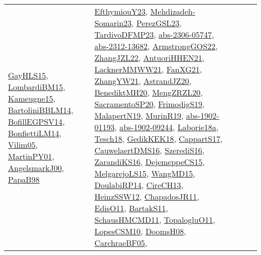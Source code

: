 {\begin{longtable}{llp{6cm}p{6cm}p{6cm}}
\href{papers/GayHLS15.pdf}{GayHLS15}\cite{GayHLS15}, \href{papers/LombardiBM15.pdf}{LombardiBM15}\cite{LombardiBM15}, \href{articles/Kameugne15.pdf}{Kameugne15}\cite{Kameugne15}, \href{papers/BartoliniBBLM14.pdf}{BartoliniBBLM14}\cite{BartoliniBBLM14}, \href{papers/BofillEGPSV14.pdf}{BofillEGPSV14}\cite{BofillEGPSV14}, \href{papers/BonfiettiLM14.pdf}{BonfiettiLM14}\cite{BonfiettiLM14}, \href{papers/Vilim05.pdf}{Vilim05}\cite{Vilim05}, \href{articles/MartinPY01.pdf}{MartinPY01}\cite{MartinPY01}, \href{papers/AngelsmarkJ00.pdf}{AngelsmarkJ00}\cite{AngelsmarkJ00}, \href{articles/PapaB98.pdf}{PapaB98}\cite{PapaB98} & \href{papers/EfthymiouY23.pdf}{EfthymiouY23}\cite{EfthymiouY23}, \href{papers/Mehdizadeh-Somarin23.pdf}{Mehdizadeh-Somarin23}\cite{Mehdizadeh-Somarin23}, \href{papers/PerezGSL23.pdf}{PerezGSL23}\cite{PerezGSL23}, \href{papers/TardivoDFMP23.pdf}{TardivoDFMP23}\cite{TardivoDFMP23}, \href{articles/abs-2306-05747.pdf}{abs-2306-05747}\cite{abs-2306-05747}, \href{articles/abs-2312-13682.pdf}{abs-2312-13682}\cite{abs-2312-13682}, \href{papers/ArmstrongGOS22.pdf}{ArmstrongGOS22}\cite{ArmstrongGOS22}, \href{papers/ZhangJZL22.pdf}{ZhangJZL22}\cite{ZhangJZL22}, \href{papers/AntuoriHHEN21.pdf}{AntuoriHHEN21}\cite{AntuoriHHEN21}, \href{papers/LacknerMMWW21.pdf}{LacknerMMWW21}\cite{LacknerMMWW21}, \href{articles/FanXG21.pdf}{FanXG21}\cite{FanXG21}, \href{articles/ZhangYW21.pdf}{ZhangYW21}\cite{ZhangYW21}, \href{articles/AstrandJZ20.pdf}{AstrandJZ20}\cite{AstrandJZ20}, \href{articles/BenediktMH20.pdf}{BenediktMH20}\cite{BenediktMH20}, \href{articles/MengZRZL20.pdf}{MengZRZL20}\cite{MengZRZL20}, \href{articles/SacramentoSP20.pdf}{SacramentoSP20}\cite{SacramentoSP20}, \href{papers/FrimodigS19.pdf}{FrimodigS19}\cite{FrimodigS19}, \href{papers/MalapertN19.pdf}{MalapertN19}\cite{MalapertN19}, \href{papers/MurinR19.pdf}{MurinR19}\cite{MurinR19}, \href{articles/abs-1902-01193.pdf}{abs-1902-01193}\cite{abs-1902-01193}, \href{articles/abs-1902-09244.pdf}{abs-1902-09244}\cite{abs-1902-09244}, \href{papers/Laborie18a.pdf}{Laborie18a}\cite{Laborie18a}, \href{papers/Tesch18.pdf}{Tesch18}\cite{Tesch18}, \href{articles/GedikKEK18.pdf}{GedikKEK18}\cite{GedikKEK18}, \href{papers/CappartS17.pdf}{CappartS17}\cite{CappartS17}, \href{papers/CauwelaertDMS16.pdf}{CauwelaertDMS16}\cite{CauwelaertDMS16}, \href{papers/SzerediS16.pdf}{SzerediS16}\cite{SzerediS16}, \href{articles/ZarandiKS16.pdf}{ZarandiKS16}\cite{ZarandiKS16}, \href{papers/DejemeppeCS15.pdf}{DejemeppeCS15}\cite{DejemeppeCS15}, \href{papers/MelgarejoLS15.pdf}{MelgarejoLS15}\cite{MelgarejoLS15}, \href{articles/WangMD15.pdf}{WangMD15}\cite{WangMD15}, \href{papers/DoulabiRP14.pdf}{DoulabiRP14}\cite{DoulabiRP14}, \href{papers/CireCH13.pdf}{CireCH13}\cite{CireCH13}, \href{articles/HeinzSSW12.pdf}{HeinzSSW12}\cite{HeinzSSW12}, \href{papers/ChapadosJR11.pdf}{ChapadosJR11}\cite{ChapadosJR11}, \href{papers/EdisO11.pdf}{EdisO11}\cite{EdisO11}, \href{articles/BartakS11.pdf}{BartakS11}\cite{BartakS11}, \href{articles/SchausHMCMD11.pdf}{SchausHMCMD11}\cite{SchausHMCMD11}, \href{articles/TopalogluO11.pdf}{TopalogluO11}\cite{TopalogluO11}, \href{articles/LopesCSM10.pdf}{LopesCSM10}\cite{LopesCSM10}, \href{papers/DoomsH08.pdf}{DoomsH08}\cite{DoomsH08}, \href{papers/CarchraeBF05.pdf}{CarchraeBF05}\cite{CarchraeBF05}, 
\end{longtable}}
